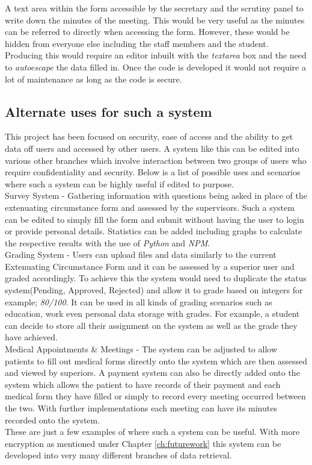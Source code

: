 \documentclass[../main.tex]{subfiles}
\begin{document}
A text area within the form accessible by the secretary and the scrutiny panel to write down the minutes of the meeting. This would be very useful as the minutes can be referred to directly when accessing the form. However, these would be hidden from everyone else including the staff members and the student. Producing this would require an editor inbuilt with the \textit{textarea} box and the need to \textit{autoescape} the data filled in. Once the code is developed it would not require a lot of maintenance as long as the code is secure. 

\subsection*{Alternate uses for such a system}
This project has been focused on security, ease of access and the ability to get data off users and accessed by other users. A system like this can be edited into various other branches which involve interaction between two groups of users who require confidentiality and security. Below is a list of possible uses and scenarios where such a system can be highly useful if edited to purpose.\\[4mm]
 
Survey System - Gathering information with questions being asked in place of the extenuating circumstance form and assessed by the supervisors. Such a system can be edited to simply fill the form and submit without having the user to login or provide personal details. Statistics can be added including graphs to calculate the respective results with the use of \textit{Python} and \textit{NPM}. \\[4mm]

Grading System - Users can upload files and data similarly to the current Extenuating Circumstance Form and it can be assessed by a superior user and graded accordingly. To achieve this the system would need to duplicate the status system(Pending, Approved, Rejected) and allow it to grade based on integers for example; \textit{80/100}. It can be used in all kinds of grading scenarios such as education, work even personal data storage with grades. For example, a student can decide to store all their assignment on the system as well as the grade they have achieved. \\[4mm]

Medical Appointments \& Meetings - The system can be adjusted to allow patients to fill out medical forms directly onto the system which are then assessed and viewed by superiors. A payment system can also be directly added onto the system which allows the patient to have records of their payment and each medical form they have filled or simply to record every meeting occurred between the two. With further implementations each meeting can have its minutes recorded onto the system.\\[4mm]

These are just a few examples of where such a system can be useful. With more encryption as mentioned under Chapter \ref{ch:futurework} this system can be developed into very many different branches of data retrieval.
\end{document}
